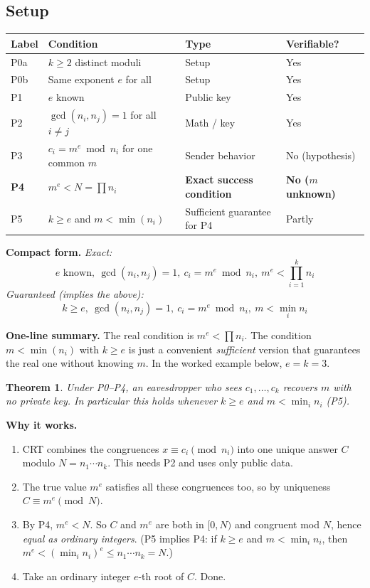 \documentclass[11pt]{article}
\newtheorem{theorem}{Theorem}
\begin{document}
\subsection*{Setup}
\begin{center}
\begin{tabular}{@{}>{\raggedright\arraybackslash}p{1.1cm}>{\raggedright\arraybackslash}p{7.9cm}>{\raggedright\arraybackslash}p{3.4cm}>{\raggedright\arraybackslash}p{2.6cm}@{}}
\toprule
\textbf{Label} & \textbf{Condition} & \textbf{Type} & \textbf{Verifiable?} \\
\midrule
P0a & $k\ge2$ distinct moduli & Setup & Yes \\
P0b & Same exponent $e$ for all & Setup & Yes \\
P1 & $e$ known & Public key & Yes \\
P2 & $\gcd(n_i,n_j)=1$ for all $i\ne j$ & Math / key & Yes \\
P3 & $c_i=m^e\bmod n_i$ for one common $m$ & Sender behavior & No (hypothesis) \\
\textbf{P4} & \textbf{$m^e<N=\prod n_i$} & \textbf{Exact success condition} & \textbf{No ($m$ unknown)} \\
P5 & $k\ge e$ and $m<\min(n_i)$ & Sufficient guarantee for P4 & Partly \\
\bottomrule
\end{tabular}
\end{center}

\textbf{Compact form.}
\emph{Exact:}
\[
\boxed{\;e\text{ known},\ \gcd(n_i,n_j)=1,\ c_i=m^e\bmod n_i,\ m^e<\prod_{i=1}^{k}n_i\;}
\]
\emph{Guaranteed (implies the above):}
\[
\boxed{\;k\ge e,\ \gcd(n_i,n_j)=1,\ c_i=m^e\bmod n_i,\ m<\min_i n_i\;}
\]

\textbf{One-line summary.} The real condition is $m^e<\prod n_i$. The condition $m<\min(n_i)$ with $k\ge e$ is just a convenient \emph{sufficient} version that guarantees the real one without knowing $m$. In the worked example below, $e=k=3$.

\begin{theorem}
Under P0--P4, an eavesdropper who sees $c_1,\dots,c_k$ recovers $m$ with no private key. In particular this holds whenever $k\ge e$ and $m<\min_i n_i$ (P5).
\end{theorem}

\textbf{Why it works.}
\begin{enumerate}[nosep]
\item CRT combines the congruences $x\equiv c_i \pmod{n_i}$ into one unique answer $C$ modulo $N=n_1\cdots n_k$. This needs P2 and uses only public data.
\item The true value $m^e$ satisfies all these congruences too, so by uniqueness $C\equiv m^e \pmod N$.
\item By P4, $m^e<N$. So $C$ and $m^e$ are both in $[0,N)$ and congruent mod $N$, hence \emph{equal as ordinary integers}. (P5 implies P4: if $k\ge e$ and $m<\min_i n_i$, then $m^e<(\min_i n_i)^e\le n_1\cdots n_k=N$.)
\item Take an ordinary integer $e$-th root of $C$. Done.
\end{enumerate}
\end{document}

